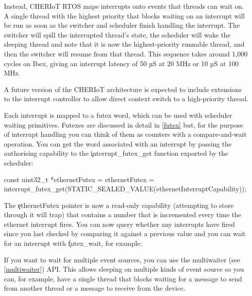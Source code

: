 Instead, CHERIoT RTOS maps interrupts onto events that threads can wait on.
A single thread with the highest priority that blocks waiting on an interrupt will be run as soon as the switcher and scheduler finish handling the interrupt.
The switcher will spill the interrupted thread's state, the scheduler will wake the sleeping thread and note that it is now the highest-priority runnable thread, and then the switcher will resume from that thread.
This sequence takes around 1,000 cycles on Ibex, giving an interrupt latency of 50 µS at 20 MHz or 10 µS at 100 MHz.

\begin{note}
A future version of the CHERIoT architecture is expected to include extensions to the interrupt controller to allow direct context switch to a high-priority thread.
\end{note}

Each interrupt is mapped to a futex word, which can be used with scheduler waiting primitives.
Futexes are discussed in detail in \ref{futex} but, for the purpose of interrupt handling you can think of them as counters with a compare-and-wait operation.
You can get the word associated with an interrupt by passing the authorising capability to the \c{interrupt_futex_get} function exported by the scheduler:

\begin{cxxsnippet}
const uint32_t *ethernetFutex = ethernetFutex =
	interrupt_futex_get(STATIC_SEALED_VALUE(ethernetInterruptCapability));
\end{cxxsnippet}

The \c{ethernetFutex} pointer is now a read-only capability (attempting to store through it will trap) that contains a number that is incremented every time the ethernet interrupt fires.
You can now query whether any interrupts have fired since you last checked by comparing it against a previous value and you can wait for an interrupt with \c{futex_wait}, for example:

\begin{cxxsnippet}
[,cpp]
do
{
    uint32_t last = *ethernetFutex;
    // Handle interrupt here
\} while (futex_wait(ethernetFutex, last) == 0);
\end{cxxsnippet}

If you want to wait for multiple event sources, you can use the multiwaiter (see \ref{multiwaiter}) API.
This allows sleeping on multiple kinds of event source so you can, for example, have a single thread that blocks waiting for a message to send from another thread or a message to receive from the device.

